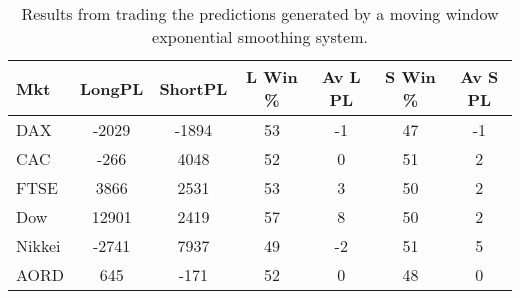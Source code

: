 \begin{table}[ht]
\centering
\caption[Results from trading the predictions generated by a moving window exponential smoothing system]{Results from trading the predictions generated by a moving window exponential smoothing system.} 
\label{tab:es_sys}
\begin{tabular}{lcccccc}
  \toprule Mkt & LongPL & ShortPL & L Win \% & Av L PL & S Win \% & Av S PL \\ 
  \midrule DAX & -2029 & -1894 & 53 & -1 & 47 & -1 \\ 
  CAC & -266 & 4048 & 52 & 0 & 51 & 2 \\ 
  FTSE & 3866 & 2531 & 53 & 3 & 50 & 2 \\ 
  Dow & 12901 & 2419 & 57 & 8 & 50 & 2 \\ 
  Nikkei & -2741 & 7937 & 49 & -2 & 51 & 5 \\ 
  AORD & 645 & -171 & 52 & 0 & 48 & 0 \\ 
   \bottomrule \end{tabular}
\end{table}
